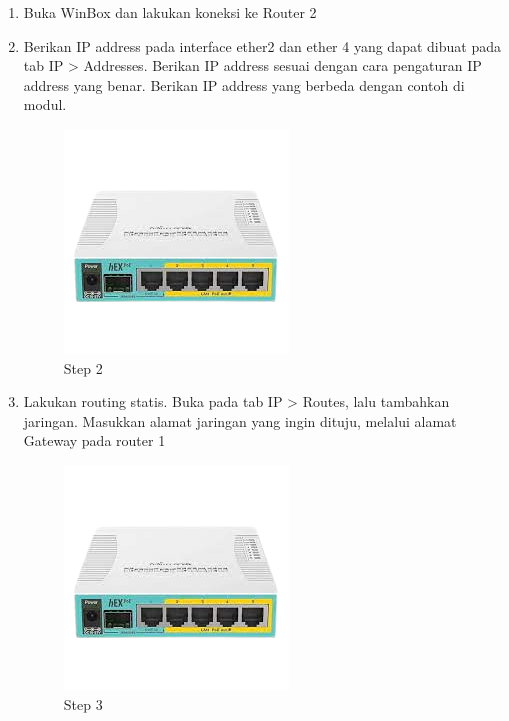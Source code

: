 \begin{enumerate}
	\item Buka WinBox dan lakukan koneksi ke Router 2

	\item Berikan IP address pada interface ether2 dan ether 4 yang dapat dibuat pada tab IP > Addresses. Berikan IP address sesuai dengan cara pengaturan IP address yang benar. Berikan IP
	address yang berbeda dengan contoh di modul.
	\begin{figure}[H]
		\centering
		\includegraphics[width=0.5\linewidth]{P1/img/contoh.png}
		\caption{Step 2}
		\label{fig:gambar6}
	\end{figure}

	\item Lakukan routing statis. Buka pada tab IP > Routes, lalu tambahkan jaringan. Masukkan alamat
	jaringan yang ingin dituju, melalui alamat Gateway pada router 1
	\begin{figure}[H]
		\centering
		\includegraphics[width=0.5\linewidth]{P1/img/contoh.png}
		\caption{Step 3}
		\label{fig:gambar7}
	\end{figure}

\end{enumerate}


